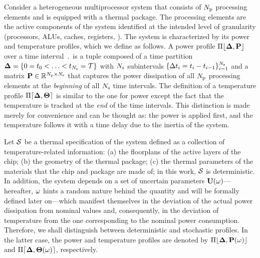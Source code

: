 Consider a heterogeneous multiprocessor system that consists of ${N_\text{p}}$ processing elements and is equipped with a thermal package. The processing elements are the active components of the system identified at the intended level of granularity (processors, ALUs, caches, registers, \etc). The system is characterized by its power and temperature profiles, which we define as follows. A power profile $\profP$ over a time interval $\period$ is a tuple composed of a time partition $\boldsymbol{\Delta} = \{ 0 = t_0 < \dotsc < t_{N_\text{s}} = \mathcal{T} \}$ with $N_\text{s}$ subintervals $\{ \Delta t_i = t_i - t_{i - 1} \}_{i = 1}^{N_\text{s}}$ and a matrix $\mP \in \real^{\cores \times \steps}$ that captures the power dissipation of all ${N_\text{p}}$ processing elements at the \emph{beginning} of all $N_\text{s}$ time intervals. The definition of a temperature profile $\profT$ is similar to the one for power except the fact that the temperature is tracked at the \emph{end} of the time intervals. This distinction is made merely for convenience and can be thought as: the power is applied first, and the temperature follows it with a time delay due to the inertia of the system.

Let $\mathcal{S}$ be a thermal specification of the system defined as a collection of temperature-related information: (a) the floorplans of the active layers of the chip; (b) the geometry of the thermal package; (c) the thermal parameters of the materials that the chip and package are made of; in this work, $\mathcal{S}$ is deterministic. In addition, the system depends on a set of uncertain parameters $\mathbf{U}(\omega)$---hereafter, $\omega$ hints a random nature behind the quantity and will be formally defined later on---which manifest themselves in the deviation of the actual power dissipation from nominal values and, consequently, in the deviation of temperature from the one corresponding to the nominal power consumption. Therefore, we shall distinguish between deterministic and stochastic profiles. In the latter case, the power and temperature profiles are denoted by $\profP{\o}$ and $\profT{\o}$, respectively.

